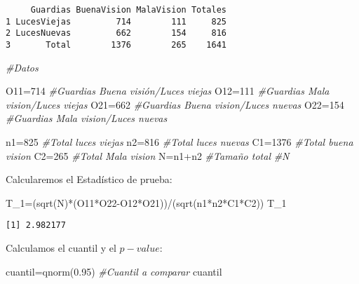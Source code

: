 \documentclass[
  a4paper,
  oneside,
  openany]{book}
\newenvironment{Shaded}{\begin{snugshade}}{\end{snugshade}}
\newcommand{\CommentTok}[1]{\textcolor[rgb]{0.56,0.35,0.01}{\textit{#1}}}
\newcommand{\DecValTok}[1]{\textcolor[rgb]{0.00,0.00,0.81}{#1}}
\newcommand{\FloatTok}[1]{\textcolor[rgb]{0.00,0.00,0.81}{#1}}
\newcommand{\FunctionTok}[1]{\textcolor[rgb]{0.00,0.00,0.00}{#1}}
\newcommand{\NormalTok}[1]{#1}
\newcommand{\OtherTok}[1]{\textcolor[rgb]{0.56,0.35,0.01}{#1}}
\newcommand{\SpecialCharTok}[1]{\textcolor[rgb]{0.00,0.00,0.00}{#1}}
\begin{document}
\begin{verbatim}
     Guardias BuenaVision MalaVision Totales
1 LucesViejas         714        111     825
2 LucesNuevas         662        154     816
3       Total        1376        265    1641
\end{verbatim}

\begin{Shaded}
\begin{Highlighting}[]
\CommentTok{\#Datos}

\NormalTok{O11}\OtherTok{=}\DecValTok{714}    \CommentTok{\#Guardias Buena visión/Luces viejas}
\NormalTok{O12}\OtherTok{=}\DecValTok{111}    \CommentTok{\#Guardias Mala vision/Luces viejas}
\NormalTok{O21}\OtherTok{=}\DecValTok{662}    \CommentTok{\#Guardias Buena vision/Luces nuevas}
\NormalTok{O22}\OtherTok{=}\DecValTok{154}    \CommentTok{\#Guardias Mala vision/Luces nuevas}

\NormalTok{n1}\OtherTok{=}\DecValTok{825}      \CommentTok{\#Total luces viejas         }
\NormalTok{n2}\OtherTok{=}\DecValTok{816}      \CommentTok{\#Total luces nuevas}
\NormalTok{C1}\OtherTok{=}\DecValTok{1376}     \CommentTok{\#Total buena vision}
\NormalTok{C2}\OtherTok{=}\DecValTok{265}      \CommentTok{\#Total Mala vision}
\NormalTok{N}\OtherTok{=}\NormalTok{n1}\SpecialCharTok{+}\NormalTok{n2     }\CommentTok{\#Tamaño total }
\CommentTok{\#N}
\end{Highlighting}
\end{Shaded}

Calcularemos el Estadístico de prueba:

\begin{Shaded}
\begin{Highlighting}[]
\NormalTok{T\_1}\OtherTok{=}\NormalTok{(}\FunctionTok{sqrt}\NormalTok{(N)}\SpecialCharTok{*}\NormalTok{(O11}\SpecialCharTok{*}\NormalTok{O22}\SpecialCharTok{{-}}\NormalTok{O12}\SpecialCharTok{*}\NormalTok{O21))}\SpecialCharTok{/}\NormalTok{(}\FunctionTok{sqrt}\NormalTok{(n1}\SpecialCharTok{*}\NormalTok{n2}\SpecialCharTok{*}\NormalTok{C1}\SpecialCharTok{*}\NormalTok{C2))}
\NormalTok{T\_1}
\end{Highlighting}
\end{Shaded}

\begin{verbatim}
[1] 2.982177
\end{verbatim}

Calculamos el cuantil y el \(p-value\):

\begin{Shaded}
\begin{Highlighting}[]
\NormalTok{cuantil}\OtherTok{=}\FunctionTok{qnorm}\NormalTok{(}\FloatTok{0.95}\NormalTok{)  }\CommentTok{\#Cuantil a comparar}
\NormalTok{cuantil}
\end{Highlighting}
\end{Shaded}
\end{document}
